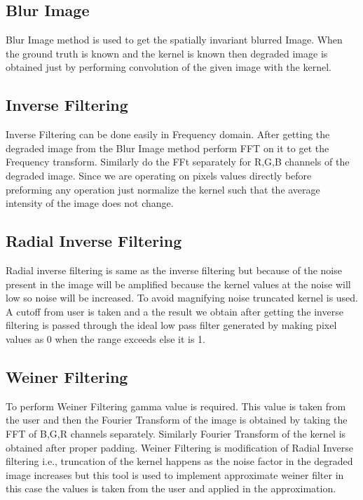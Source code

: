 \documentclass{article}
\begin{document}
\subsection{Blur Image}
Blur Image method is used to get the spatially invariant blurred Image. When the ground truth is known and the kernel is known then degraded image is obtained just by performing convolution of the given image with the kernel.
\subsection{Inverse Filtering}
Inverse Filtering can be done easily in Frequency domain. After getting the degraded image from the  Blur Image method perform FFT on it to get the Frequency transform. Similarly do the FFt separately for R,G,B channels of the degraded image. Since we are operating on pixels values directly before preforming any operation just normalize the kernel such that the average intensity of the image does not change.

\subsection{Radial Inverse Filtering}
Radial inverse filtering is same as the inverse filtering but because of the noise present in the image will be amplified because the kernel values at the noise will low so noise will be increased. To avoid magnifying noise truncated kernel is used. A cutoff from user is taken and a the result we obtain after getting the inverse filtering is passed through the ideal low pass filter generated by making pixel values as 0 when the range exceeds else it is 1.

\subsection{Weiner Filtering}
To perform Weiner Filtering gamma value is required. This value is taken from the user and then the Fourier Transform of the image is obtained by taking the FFT of B,G,R channels separately. Similarly Fourier Transform of the kernel is obtained after proper padding. Weiner Filtering is modification of Radial Inverse filtering i.e., truncation of the kernel happens as the noise factor in the degraded image increases but this tool is used to implement approximate weiner filter in this case the values is taken from the user and applied in the approximation.
\end{document}
